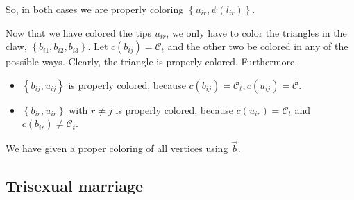 So, in both cases we are properly coloring $\left\{ u_{ir}, \psi(l_{ir})
\right\} $.

Now that we have colored the tips $u_{ir}$, we only have to color the triangles
in the claw, $\left\{ b_{i 1}, b_{i 2}, b_{i 3} \right\} $. Let $c(b_{ij}) =
\mathcal{C}_t$ and the other two be colored in any of the possible ways. Clearly, the triangle is properly colored. Furthermore, 

\begin{itemize}
    \item $\left\{ b_{ij}, u_{ij} \right\} $ is properly colored, because $c(b_{ij}) = \mathcal{C}_t, c(u_{ij}) = \mathcal{C}$. 

    \item $\left\{ b_{ir}, u_{ir} \right\} $ with $r \neq j$ is properly colored, because $c(u_{ir}) = \mathcal{C}_t$ and $c(b_{ir}) \neq \mathcal{C}_t$.
\end{itemize}

We have given a proper coloring of all vertices using $\overrightarrow{b}$.

\subsection{Trisexual marriage}






